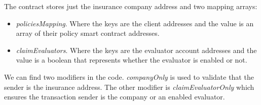 {The contract stores just the insurance company address and two mapping arrays:
\begin{itemize}
    \item \textit{policiesMapping}. Where the keys are the client addresses and the value is an array of their policy smart contract addresses.
    \item \textit{claimEvaluators}. Where the keys are the evaluator account addresses and the value is a boolean that represents whether the evaluator is enabled or not.
\end{itemize}

We can find two modifiers in the code. \textit{companyOnly} is used to validate that the sender is the insurance address. The other modifier is \textit{claimEvaluatorOnly} which ensures the transaction sender is the company or an enabled evaluator. 

}
